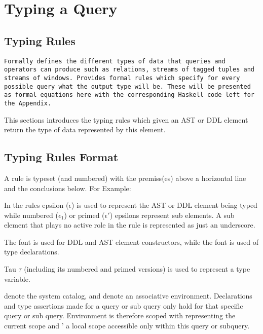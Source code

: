 \section{Typing a \SNEEql Query}
\subsection{Typing Rules}
\label{sec_TypingRules}
\texttt{Formally defines the different types of data that queries and operators can produce such as relations, streams of tagged tuples and streams of windows.
Provides formal rules which specify for every possible query what the output type will be.
These will be presented as formal equations here with the corresponding Haskell code left for the Appendix.}

This sections introduces the typing rules which given an AST or DDL element return the type of data represented by this element.

%

\subsection{Typing Rules Format}
\label{sec_TypingRulesFormat}

A rule is typeset (and numbered) with the premiss(es) above a horizontal
line and the conclusions below. For Example:


In the rules epsilon ($\epsilon$) is used to represent the AST or DDL element being typed while numbered ($\epsilon_1$) or primed ($\epsilon'$) epsilons represent sub elements.
A sub element that plays no active role in the rule is represented as just an underscore.

The font  is used for DDL and AST element constructors,
while the font  is used of type declarations. 

Tau $\tau$ (including its numbered and primed versions) is used to represent a type variable.

\syscat denote the system catalog, and \environment denote an associative environment.
Declarations and type assertions made for a query or sub query only hold for that specific query or sub query.
Environment is therefore scoped with \environment representing the current scope and \environment' a local scope accessible only within this query or subquery.

